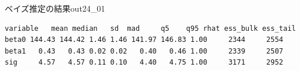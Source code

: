 \begin{SCcmd}{ベイズ推定の結果}{out24_01}
	\begin{verbatim}
variable   mean median   sd  mad     q5    q95 rhat ess_bulk ess_tail
beta0 144.43 144.42 1.46 1.46 141.97 146.83 1.00     2344     2554
beta1   0.43   0.43 0.02 0.02   0.40   0.46 1.00     2339     2507
sig     4.57   4.57 0.11 0.10   4.40   4.75 1.00     3171     2952\end{verbatim}
\end{SCcmd}
